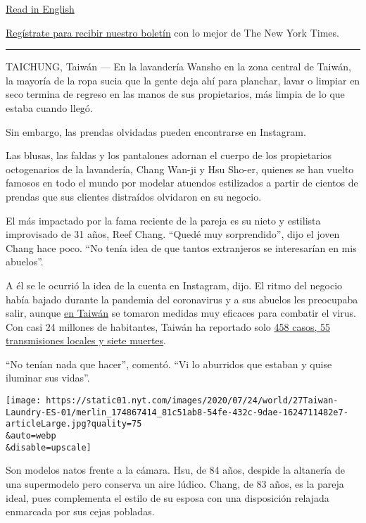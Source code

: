 \href{https://www.nytimes.com/2020/07/24/world/asia/taiwan-octogenarian-couple-instagram-laundry.html}{Read
in English}

\href{https://www.nytimes.com/newsletters/el-times}{Regístrate para
recibir nuestro boletín} con lo mejor de The New York Times.

\begin{center}\rule{0.5\linewidth}{\linethickness}\end{center}

TAICHUNG, Taiwán --- En la lavandería Wansho en la zona central de
Taiwán, la mayoría de la ropa sucia que la gente deja ahí para planchar,
lavar o limpiar en seco termina de regreso en las manos de sus
propietarios, más limpia de lo que estaba cuando llegó.

Sin embargo, las prendas olvidadas pueden encontrarse en Instagram.

Las blusas, las faldas y los pantalones adornan el cuerpo de los
propietarios octogenarios de la lavandería, Chang Wan-ji y Hsu Sho-er,
quienes se han vuelto famosos en todo el mundo por modelar atuendos
estilizados a partir de cientos de prendas que sus clientes distraídos
olvidaron en su negocio.

El más impactado por la fama reciente de la pareja es su nieto y
estilista improvisado de 31 años, Reef Chang. ``Quedé muy sorprendido'',
dijo el joven Chang hace poco. ``No tenía idea de que tantos extranjeros
se interesarían en mis abuelos''.

A él se le ocurrió la idea de la cuenta en Instagram, dijo. El ritmo del
negocio había bajado durante la pandemia del coronavirus y a sus abuelos
les preocupaba salir, aunque
\href{https://www.nytimes.com/interactive/2020/04/09/world/asia/coronavirus-hong-kong-singapore-taiwan.html?searchResultPosition=26}{en
Taiwán} se tomaron medidas muy eficaces para combatir el virus. Con casi
24 millones de habitantes, Taiwán ha reportado solo
\href{https://www.cdc.gov.tw/En}{458 casos, 55 transmisiones locales y
siete muertes}.

``No tenían nada que hacer'', comentó. ``Vi lo aburridos que estaban y
quise iluminar sus vidas''.

\texttt{[image: https://static01.nyt.com/images/2020/07/24/world/27Taiwan-Laundry-ES-01/merlin\_174867414\_81c51ab8-54fe-432c-9dae-1624711482e7-articleLarge.jpg?quality=75\\\&auto=webp\\\&disable=upscale]}

Son modelos natos frente a la cámara. Hsu, de 84 años, despide la
altanería de una supermodelo pero conserva un aire lúdico. Chang, de 83
años, es la pareja ideal, pues complementa el estilo de su esposa con
una disposición relajada enmarcada por sus cejas pobladas.

